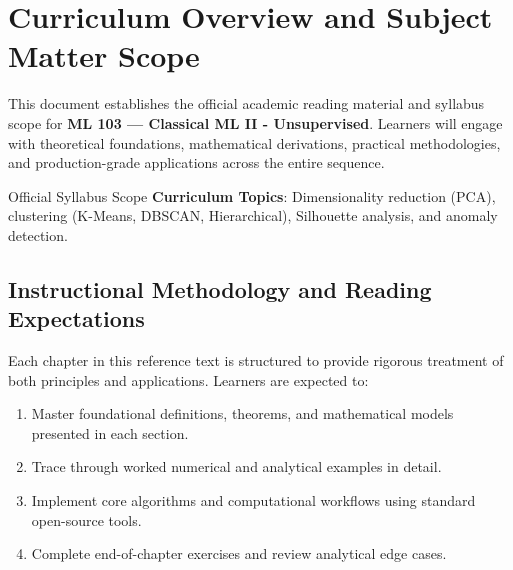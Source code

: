 \section{Curriculum Overview and Subject Matter Scope}

This document establishes the official academic reading material and syllabus scope for \textbf{ML 103 --- Classical ML II - Unsupervised}. Learners will engage with theoretical foundations, mathematical derivations, practical methodologies, and production-grade applications across the entire sequence.

\begin{InsightBox}{Official Syllabus Scope}
  \textbf{Curriculum Topics}: Dimensionality reduction (PCA), clustering (K-Means, DBSCAN, Hierarchical), Silhouette analysis, and anomaly detection.
\end{InsightBox}

\subsection{Instructional Methodology and Reading Expectations}

Each chapter in this reference text is structured to provide rigorous treatment of both principles and applications. Learners are expected to:
\begin{enumerate}
  \item Master foundational definitions, theorems, and mathematical models presented in each section.
  \item Trace through worked numerical and analytical examples in detail.
  \item Implement core algorithms and computational workflows using standard open-source tools.
  \item Complete end-of-chapter exercises and review analytical edge cases.
\end{enumerate}

